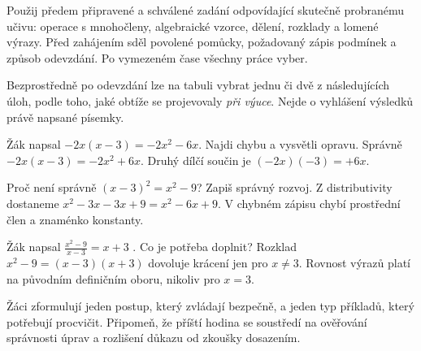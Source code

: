 \documentclass[11pt,a4paper]{article}
\begin{document}
\begin{zadaniBox}[title={Poznámka pro učitele - Organizace testu}]
Použij předem připravené a schválené zadání odpovídající skutečně probranému učivu: operace s mnohočleny, algebraické vzorce, dělení, rozklady a lomené výrazy. Před zahájením sděl povolené pomůcky, požadovaný zápis podmínek a způsob odevzdání. Po vymezeném čase všechny práce vyber.
\end{zadaniBox}
Bezprostředně po odevzdání lze na tabuli vybrat jednu či dvě z následujících úloh, podle toho, jaké obtíže se projevovaly \emph{při výuce}. Nejde o vyhlášení výsledků právě napsané písemky.
\begin{zadaniReseniBox}[breakable=false,title={Samostatná práce 1}]
Žák napsal $-2x(x-3)=-2x^2-6x$. Najdi chybu a vysvětli opravu.
\tcblower
Správně $-2x(x-3)=-2x^2+6x$. Druhý dílčí součin je $(-2x)(-3)=+6x$.
\end{zadaniReseniBox}
\begin{zadaniReseniBox}[breakable=false,title={Samostatná práce 2}]
Proč není správně $(x-3)^2=x^2-9$? Zapiš správný rozvoj.
\tcblower
Z distributivity dostaneme $x^2-3x-3x+9=x^2-6x+9$. V chybném zápisu chybí prostřední člen a znaménko konstanty.
\end{zadaniReseniBox}
\begin{zadaniReseniBox}[breakable=false,title={Samostatná práce 3}]
Žák napsal $\frac{x^2-9}{x-3}=x+3$ . Co je potřeba doplnit?
\tcblower
Rozklad $x^2-9=(x-3)(x+3)$ dovoluje krácení jen pro $x\ne3$. Rovnost výrazů platí na původním definičním oboru, nikoliv pro $x=3$.
\end{zadaniReseniBox}
\begin{zadaniBox}[title={Samostatná práce 4}]
Žáci zformulují jeden postup, který zvládají bezpečně, a jeden typ příkladů, který potřebují procvičit. Připomeň, že příští hodina se soustředí na ověřování správnosti úprav a rozlišení důkazu od zkoušky dosazením.
\end{zadaniBox}
\end{document}
